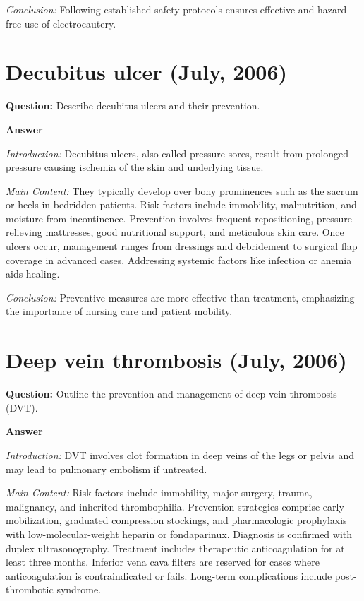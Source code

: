 \documentclass{article}
\begin{document}
\emph{Conclusion:} Following established safety protocols ensures effective and hazard-free use of electrocautery.


\section{Decubitus ulcer (July, 2006)}


\textbf{Question:} Describe decubitus ulcers and their prevention.

\textbf{Answer}

\emph{Introduction:} Decubitus ulcers, also called pressure sores, result from prolonged pressure causing ischemia of the skin and underlying tissue.

\emph{Main Content:} They typically develop over bony prominences such as the sacrum or heels in bedridden patients. Risk factors include immobility, malnutrition, and moisture from incontinence. Prevention involves frequent repositioning, pressure-relieving mattresses, good nutritional support, and meticulous skin care. Once ulcers occur, management ranges from dressings and debridement to surgical flap coverage in advanced cases. Addressing systemic factors like infection or anemia aids healing.

\emph{Conclusion:} Preventive measures are more effective than treatment, emphasizing the importance of nursing care and patient mobility.


\section{Deep vein thrombosis (July, 2006)}


\textbf{Question:} Outline the prevention and management of deep vein thrombosis (DVT).

\textbf{Answer}

\emph{Introduction:} DVT involves clot formation in deep veins of the legs or pelvis and may lead to pulmonary embolism if untreated.

\emph{Main Content:} Risk factors include immobility, major surgery, trauma, malignancy, and inherited thrombophilia. Prevention strategies comprise early mobilization, graduated compression stockings, and pharmacologic prophylaxis with low-molecular-weight heparin or fondaparinux. Diagnosis is confirmed with duplex ultrasonography. Treatment includes therapeutic anticoagulation for at least three months. Inferior vena cava filters are reserved for cases where anticoagulation is contraindicated or fails. Long-term complications include post-thrombotic syndrome.
\end{document}
